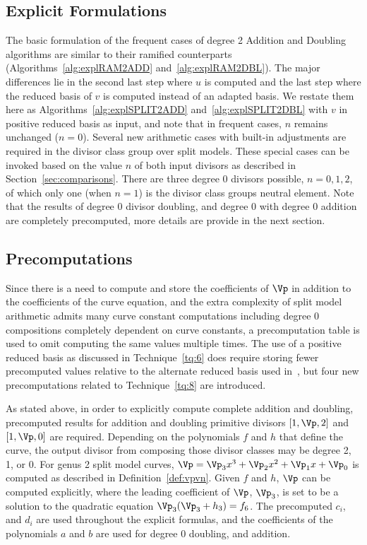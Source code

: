 \subsection{Explicit Formulations}
The basic formulation of the frequent cases of degree 2 Addition and Doubling
algorithms are similar to their ramified counterparts
(Algorithms~\ref{alg:explRAM2ADD} and~\ref{alg:explRAM2DBL}). The major
differences lie in the second last step where $u$ is computed and the last step
where the reduced basis of $v$ is computed instead of an adapted basis. We
restate them here as Algorithms~\ref{alg:explSPLIT2ADD}
and~\ref{alg:explSPLIT2DBL} with  $v$ in positive reduced basis as input, and
note that in frequent cases, $n$ remains unchanged ($n = 0$). Several new
arithmetic cases with built-in adjustments are required in the divisor class
group over split models. These special cases can be invoked based on the
value $n$ of both input divisors as described in Section~\ref{sec:comparisons}.
There are three degree 0 divisors possible, $n=0,1,2$, of which only one (when
$n=1$) is the divisor class groups neutral element. Note that the results of
degree 0 divisor doubling, and degree 0 with degree 0 addition are completely
precomputed, more details are provide in the next section.

\subsection{Precomputations}
Since there is a need to compute and store the coefficients of $\Vp$ in addition
to the coefficients of the curve equation, and the extra
complexity of split model arithmetic admits many curve constant computations
including degree 0 compositions completely dependent on curve constants, a
precomputation table is used to omit computing the same values multiple times.
The use of a positive reduced basis as discussed in Technique~\ref{tq:6} does
require storing fewer precomputed values relative to the alternate reduced basis
used in~\cite[Table~1]{EricksonJacobsonStein_realg2_2011}, but four new
precomputations related to Technique~\ref{tq:8} are introduced.

As stated above, in order to explicitly compute complete addition and doubling,
precomputed results for addition and doubling primitive divisors $[1,\Vp,2]$ and
$[1,\Vp,0]$ are required. Depending on the polynomials $f$ and $h$ that define
the curve, the output divisor from composing those divisor classes may be degree
2, 1, or 0. For genus 2 split model curves, $\Vp = \Vp_3x^3 + \Vp_2x^2 + \Vp_1x
+ \Vp_0$ is computed as described in Definition~\ref{def:vpvn}. Given $f$ and
$h$, $\Vp$ can be computed explicitly, where the leading coefficient of $\Vp$,
$\Vp_3$, is set to be a solution to the quadratic equation $\Vp_3(\Vp_3 + h_3) =
f_6$. The precomputed $c_i$, and $d_i$ are used throughout the explicit
formulas, and the coefficients of the polynomials $a$ and $b$ are used for
degree 0 doubling, and addition.


